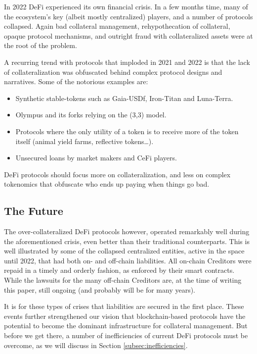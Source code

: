 \documentclass[sigconf,nonacm]{acmart}
\begin{document}
In 2022 DeFi experienced its own financial crisis.
In a few months time, many of the ecosystem's key (albeit mostly centralized) players, and a number of protocols collapsed.
Again bad collateral management, rehypothecation of collateral, opaque protocol mechanisms,
and outright fraud with collateralized assets were at the root of the problem.

A recurring trend with protocols that imploded in 2021 and 2022 is that the lack of collateralization was obfuscated behind complex protocol designs and narratives. 
Some of the notorious examples are:
\begin{itemize}
    \item Synthetic stable-tokens such as Gaia-USDf, Iron-Titan and Luna-Terra.
    \item Olympus and its forks relying on the (3,3) model.
    \item Protocols where the only utility of a token is to receive more of the token itself (animal yield farms, reflective tokens…).
    \item Unsecured loans by market makers and CeFi players.
\end{itemize}

DeFi protocols should focus more on collateralization, and less on complex tokenomics that obfuscate who ends up paying when things go bad.

\subsection{The Future}
The over-collateralized DeFi protocols however, operated remarkably well during the aforementioned crisis, even better than their traditional counterparts.
This is well illustrated by some of the collapsed centralized entities, active in the space until 2022, that had both on- and off-chain liabilities.
All on-chain Creditors were repaid in a timely and orderly fashion, as enforced by their smart contracts.
While the lawsuits for the many off-chain Creditors are, at the time of writing this paper, still ongoing (and probably will be for many years).

It is for these types of crises that liabilities are secured in the first place.
These events further strengthened our vision that blockchain-based protocols have the potential to become the dominant infrastructure for collateral management.
But before we get there, a number of inefficiencies of current DeFi protocols must be overcome, as we will discuss in Section \ref{subsec:inefficiencies}.
\end{document}
